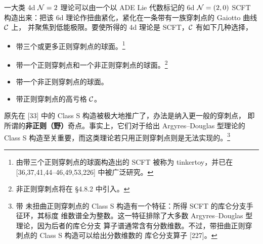 
一大类 4d $\mathcal{N}=2$ 理论可以由一个以 ADE Lie 代数标记的 6d $\mathcal{N}=(2,0)$ SCFT
构造出来：把该 6d 理论作扭曲紧化，紧化在一条带有一族穿刺点的 Gaiotto 曲线 $\mathcal{C}$ 上，
并聚焦到低能极限。要使所得的 4d 理论是 SCFT，$\mathcal{C}$ 有如下几种选择，
\begin{itemize}[leftmargin=1.8em,itemsep=2pt]
  \item 带三个或更多正则穿刺点的球面。\footnote{由带三个正则穿刺点的球面构造出的
        SCFT 被称为 tinkertoy，并已在 [36,37,41,44--46,49,53,226] 中被广泛研究。}
  \item 带一个正则穿刺点和一个非正则穿刺点的球面。\footnote{非正则穿刺点将在
        §4.8.2 中引入。}
  \item 带一个非正则穿刺点的球面。
  \item 带正则穿刺点的高亏格 $\mathcal{C}$。
\end{itemize}



原先在 [33] 中的 Class S 构造被极大地推广了，办法是纳入更一般的穿刺点，
即所谓的\textbf{非正则（野）}奇点。事实上，它们对于给出 Argyres--Douglas 型理论的
Class S 构造至关重要，而这类理论若只用正则穿刺点则是无法实现的。\footnote{带
未扭曲正则穿刺点的 Class S 构造有一个特征：所得 SCFT 的库仑分支手征环，其标度
维数谱全为整数。这一特征排除了大多数 Argyres--Douglas 型理论，因为后者的库仑分支
算子谱通常含有分数维数。不过，带扭曲正则穿刺点的 Class S 构造可以给出分数维数的
库仑分支算子 [227]。}


